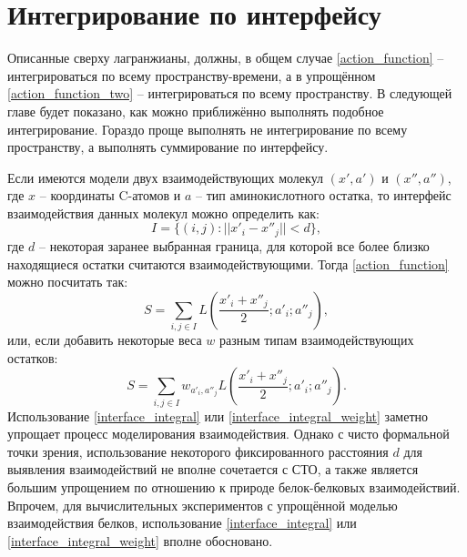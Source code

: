 \section{Интегрирование по интерфейсу}
Описанные сверху лагранжианы, должны, в общем случае \ref{action_function} -- интегрироваться по всему пространству-времени, а в упрощённом \ref{action_function_two} -- интегрироваться по всему пространству.
В следующей главе будет показано, как можно приближённо выполнять подобное интегрирование. Гораздо проще выполнять не интегрирование по всему пространству, а выполнять суммирование по интерфейсу.

Если имеются модели двух взаимодействующих молекул $(x', a')$ и $(x'', a'')$, где $x$ -- координаты C\textalpha-атомов и $a$ -- тип аминокислотного остатка, то интерфейс взаимодействия данных молекул можно определить как:
\begin{equation}
	I = \{(i, j) : ||x'_i - x''_j|| < d\},
	\label{interface_definition}
\end{equation}
где $d$ -- некоторая заранее выбранная граница, для которой все более близко находящиеся остатки считаются взаимодействующими. Тогда \ref{action_function} можно посчитать так:
\begin{equation}
	S = \sum_{i,j \in I}L(\frac{x'_i + x''_j}{2}; a'_i; a''_j),
	\label{interface_integral}
\end{equation}
или, если добавить некоторые веса $w$ разным типам взаимодействующих остатков:
\begin{equation}
	S = \sum_{i,j \in I}w_{a'_i, a''_j}L(\frac{x'_i + x''_j}{2}; a'_i; a''_j).
	\label{interface_integral_weight}
\end{equation}
Использование \ref{interface_integral} или \ref{interface_integral_weight} заметно упрощает процесс моделирования взаимодействия. Однако с чисто формальной точки зрения, использование некоторого фиксированного расстояния $d$ для выявления взаимодействий не вполне сочетается с СТО, а также является большим упрощением по отношению к природе белок-белковых взаимодействий. Впрочем, для вычислительных экспериментов с упрощённой моделью взаимодействия белков, использование \ref{interface_integral} или \ref{interface_integral_weight} вполне обосновано.